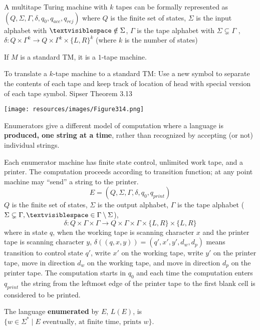 \documentclass[12pt, oneside]{article}
\begin{document}
\vfill 

 A multitape Turing machine with $k$ tapes
can be formally represented as 
$(Q, \Sigma,  \Gamma, \delta, q_0, q_{acc}, q_{rej})$ 
where $Q$ is the finite set of  states,
$\Sigma$ is the  input alphabet with  $\textvisiblespace \notin \Sigma$,
$\Gamma$  is the  tape alphabet with $\Sigma \subsetneq \Gamma$ ,
$\delta: Q\times \Gamma^k\to Q \times \Gamma^k \times \{L,R\}^k$ 
(where $k$ is  the number of  states)


If $M$ is a standard  TM, it is a $1$-tape machine.


To translate a $k$-tape machine  to  a standard TM:
Use a  new symbol to separate the contents of each tape
and keep track of location of  head with  special version of each
tape symbol. {\tiny Sipser Theorem 3.13} 

\texttt{[image: resources/images/Figure314.png]}

\newpage
{} Enumerators give a different
model of computation where a language is {\bf produced, one string at a time},
rather than recognized by accepting (or not) individual strings.

Each enumerator machine has finite state control, unlimited work tape, and a printer. The computation proceeds
according to transition function; at any point machine may ``send'' a string to the printer.
\[
E  = (Q, \Sigma, \Gamma, \delta, q_0, q_{print})  
\]
$Q$ is the finite set of states, $\Sigma$ is  the output alphabet, $\Gamma$ is the 
tape alphabet ($\Sigma  \subsetneq\Gamma, 
\textvisiblespace \in \Gamma \setminus \Sigma$), 
\[
\delta:  Q  \times  \Gamma \times \Gamma \to  Q \times  \Gamma \times  \Gamma \times \{L, R\} \times  \{L, R\}
\]
where in state $q$, when the working tape is scanning character $x$ and the printer tape is scanning character $y$,
$\delta( (q,x,y) ) = (q', x', y', d_w, d_p)$ means transition to control state $q'$, write $x'$ on 
the working tape, write $y'$ on the printer tape, move in direction $d_w$ on the working tape, and move in direction 
$d_p$ on the printer tape. The computation starts in $q_0$ and each time the computation enters $q_{print}$
the string from the leftmost edge of the printer tape to the first blank cell is considered to be printed.

The language  {\bf  enumerated} by  $E$, $L(E)$, is $\{ w \in \Sigma^* \mid \text{$E$ eventually, at finite  time, 
prints $w$} \}$.
\end{document}
